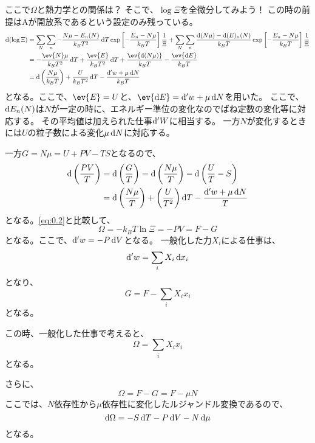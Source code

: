 \documentclass[titlepage]{ltjsarticle}
\begin{document}
ここで\(\Omega\)と熱力学との関係は？
そこで、\(\log \Xi\)を全微分してみよう！
この時の前提はAが開放系であるという設定のみ残っている。
\begin{align}
  \odif{(\log \Xi)} & = \sum_N \sum_n - \frac{N \mu-E_n(N)}{k_BT^2} \odif{T} \exp\left[ -\frac{E_n-N\mu}{k_BT} \right]\frac{1}{\Xi}  + \sum_N \sum_n \frac{\odif{(N\mu)}-\odif{(E)}_n(N)}{k_BT} \exp \left[ -\frac{E_n-N\mu}{k_BT} \right]\frac{1}{\Xi}\\
  & = -\frac{\ev{N}\mu}{k_BT^2} \odif{T} + \frac{\ev{E}}{k_BT^2}\odif{T} + \frac{\ev{\odif{(N\mu)}}}{k_BT} - \frac{\ev{\odif{E}}}{k_BT}\\
  & = \odif{\left( \frac{N \mu}{k_BT} \right)} + \frac{U}{k_BT^2} \odif{T} - \frac{\odif{'w}+\mu \odif{N}}{k_BT} \label{eq:0.2}
\end{align}
となる。ここで、\(\ev{E}=U\)と、\(\ev{\odif{E}}= \odif{'w}+ \mu \odif{N}\)を用いた。
ここで、\(\odif{E}_n(N)\)は\(N\)が一定の時に、エネルギー準位の変化なのでばね定数の変化等に対応する。
その平均値は加えられた仕事\(\odif{'W}\)に相当する。
一方\(N\)が変化するときには\(U\)の粒子数による変化\(\mu \odif{N}\)に対応する。

一方\(G=N\mu = U + PV - TS\)となるので、
\begin{align}
  \odif{\left( \frac{PV}{T} \right)} & = \odif{\left( \frac{G}{T} \right)} = 
  \odif{\left( \frac{N\mu}{T} \right)} - \odif{\left( \frac{U}{T} - S \right)} \\
  & = \odif{\left( \frac{N \mu}{T} \right)} + \left( \frac{U}{T^2} \right)\odif{T} - \frac{\odif{'w}+ \mu\odif{N}}{T} 
\end{align}
となる。\eqref{eq:0.2}と比較して、
\begin{equation}
  \Omega = -k_BT \ln \Xi = -PV = F-G 
\end{equation}
となる。ここで、\(\odif{'w}= -P \odif{V}\)となる。
一般化した力\(X_i\)による仕事は、
\begin{equation}
  \odif{'w} = \sum_i X_i \odif{x_i}
\end{equation}
となり、
\begin{equation}
  G = F - \sum_{i} X_i x_i 
\end{equation}
となる。

この時、一般化した仕事で考えると、
\begin{equation}
  \Omega = \sum_i X_ix_i 
\end{equation}
となる。

さらに、
\begin{equation}
  \Omega = F -G = F - \mu N 
\end{equation}
ここでは、\(N\)依存性から\(\mu\)依存性に変化したルジャンドル変換であるので、
\begin{equation}
  \odif{\Omega} = -S \odif{T} - P \odif{V} - N \odif{\mu}
\end{equation}
となる。
\end{document}
